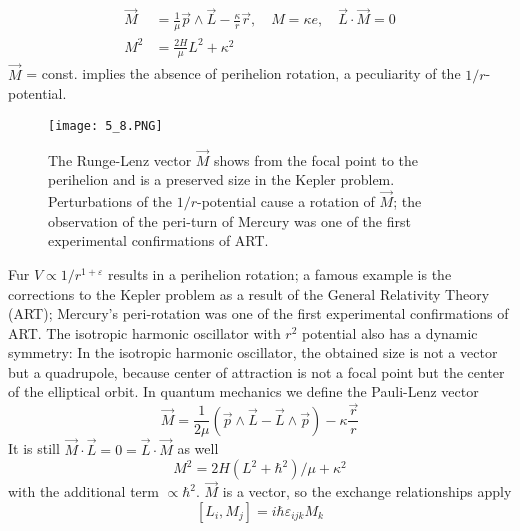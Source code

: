 \begin{equation}
\begin{aligned} \vec{M} &=\frac{1}{\mu} \vec{p} \wedge \vec{L}-\frac{\kappa}{r} \vec{r}, \quad M=\kappa e, \quad \vec{L} \cdot \vec{M}=0 \\ M^{2} &=\frac{2 H}{\mu} L^{2}+\kappa^{2} \end{aligned}
\end{equation}
$\vec{M}$ = const. implies the absence of perihelion rotation, a peculiarity of the $1 / r$-potential.
\begin{figure}[ht]
    \begin{minipage}{0.5\textwidth}
        \centering
        \texttt{[image: 5\_8.PNG]}
    \end{minipage}
    \begin{minipage}{0.5\textwidth}
        \caption{The Runge-Lenz vector $\vec{M}$ shows from the focal point to the perihelion and is a preserved size in the Kepler problem. Perturbations of the $1 / r$-potential cause a rotation of $\vec{M}$; the observation of the peri-turn of Mercury was one of the first experimental confirmations of ART.}
    \end{minipage}
\end{figure}
Fur $V\propto1/r^{1+\varepsilon}$ results in a perihelion rotation; a famous example is the corrections to the Kepler problem as a result of the General Relativity Theory (ART); Mercury's peri-rotation was one of the first experimental confirmations of ART. The isotropic harmonic oscillator with $r^2$ potential also has a dynamic symmetry: In the isotropic harmonic oscillator, the obtained size is not a vector but a quadrupole, because center of attraction is not a focal point but the center of the elliptical orbit.
In quantum mechanics we define the Pauli-Lenz vector
\begin{equation}
    \vec{M}=\frac{1}{2 \mu}(\vec{p} \wedge \vec{L}-\vec{L} \wedge \vec{p})-\kappa \frac{\vec{r}}{r}
    \end{equation}
It is still $\vec{M}\cdot\vec{L} = 0 = \vec{L}\cdot\vec{M}$ as well
\begin{equation}
    M^{2}=2 H\left(L^{2}+\hbar^{2}\right) / \mu+\kappa^{2}
    \end{equation}
with the additional term $\propto \hbar^2$. $\vec{M}$ is a vector, so the exchange relationships apply
\begin{equation}
    \left[L_{i}, M_{j}\right]=i \hbar \varepsilon_{i j k} M_{k}
    \end{equation}
